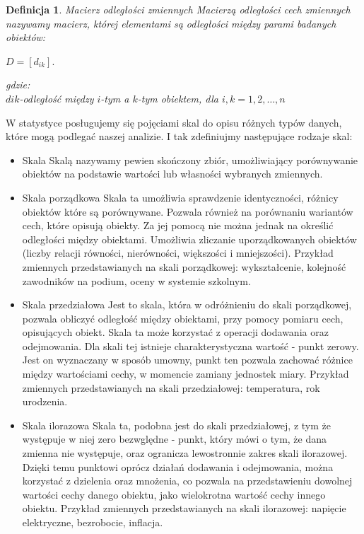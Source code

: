 \documentclass[12pt,a4paper]{report}
\newtheorem{definition}[theorem]{Definicja}
\begin{document}
\begin{definition}{Macierz odległości zmiennych \cite[Rozdział 1.6]{panek2013}}
Macierzą odległości cech zmiennych nazywamy macierz, której elementami są odległości między parami badanych obiektów: 
\begin{center}
$D = [d_{ik}].$\\
\end{center}
gdzie:\\
$dik$-odległość między $i$-tym a $k$-tym obiektem, dla $i,k=1,2,\ldots,n$
\end{definition}

W statystyce posługujemy się pojęciami skal do opisu różnych typów danych, które mogą podlegać naszej analizie. I tak zdefiniujmy następujące rodzaje skal:

\begin{itemize}
\item Skala \cite[w oparciu o rozdział 1.2]{panek2013}
Skalą nazywamy pewien skończony zbiór, umożliwiający porównywanie obiektów na podstawie wartości lub własności wybranych zmiennych.

\item Skala porządkowa \cite[Rozdział 1.2]{panek2013}
Skala ta umożliwia sprawdzenie identyczności, różnicy obiektów które są porównywane. Pozwala również na porównaniu wariantów cech, które opisują obiekty. Za jej pomocą nie można jednak na określić odległości między obiektami. Umożliwia zliczanie uporządkowanych obiektów (liczby relacji równości, nierówności, większości i mniejszości). Przykład zmiennych przedstawianych na skali porządkowej: wykształcenie, kolejność zawodników na podium, oceny w systemie szkolnym.

\item Skala przedziałowa \cite[Rozdział 1.2]{panek2013}
Jest to skala, która w odróżnieniu do skali porządkowej, pozwala obliczyć odległość między obiektami, przy pomocy pomiaru cech, opisujących obiekt. Skala ta może korzystać z operacji dodawania oraz odejmowania. Dla skali tej istnieje charakterystyczna wartość - punkt zerowy. Jest on wyznaczany w sposób umowny, punkt ten pozwala zachować różnice między wartościami cechy, w momencie zamiany jednostek miary. Przykład zmiennych przedstawianych na skali przedziałowej: temperatura, rok urodzenia. %

\item Skala ilorazowa \cite[Rozdział 1.2]{panek2013}
Skala ta, podobna jest do skali przedziałowej, z tym że występuje w niej zero bezwględne - punkt, który mówi o tym, że dana zmienna nie występuje, oraz ogranicza lewostronnie zakres skali ilorazowej. Dzięki temu punktowi oprócz działań dodawania i odejmowania, można korzystać z dzielenia oraz mnożenia, co pozwala na przedstawieniu dowolnej wartości cechy danego obiektu, jako wielokrotna wartość cechy innego obiektu. Przykład zmiennych przedstawianych na skali ilorazowej: napięcie elektryczne, bezrobocie, inflacja.


\end{itemize}
\end{document}
